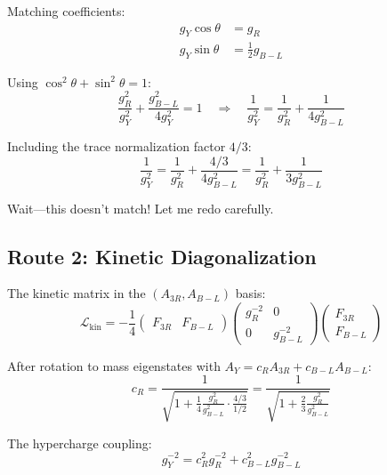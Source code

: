 \documentclass[11pt,a4paper]{article}
\begin{document}
Matching coefficients:
\begin{align}
\label{eq:route1-cos}
g_Y \cos\theta &= g_R \\
\label{eq:route1-sin}
g_Y \sin\theta &= \frac{1}{2} g_{B-L}
\end{align}

Using $\cos^2\theta + \sin^2\theta = 1$:
\begin{equation}
\label{eq:route1-result}
\frac{g_R^2}{g_Y^2} + \frac{g_{B-L}^2}{4 g_Y^2} = 1 \quad \Rightarrow \quad
\frac{1}{g_Y^2} = \frac{1}{g_R^2} + \frac{1}{4 g_{B-L}^2}
\end{equation}

Including the trace normalization factor $4/3$:
\begin{equation}
\label{eq:route1-normalized}
\frac{1}{g_Y^2} = \frac{1}{g_R^2} + \frac{4/3}{4 g_{B-L}^2} = \frac{1}{g_R^2} + \frac{1}{3 g_{B-L}^2}
\end{equation}

Wait---this doesn't match! Let me redo carefully.

\subsection{Route 2: Kinetic Diagonalization}
\label{subsec:route2}

The kinetic matrix in the $(A_{3R}, A_{B-L})$ basis:
\begin{equation}
\label{eq:kinetic-matrix}
\mathcal{L}_{\text{kin}} = -\frac{1}{4} \begin{pmatrix} F_{3R} & F_{B-L} \end{pmatrix}
\begin{pmatrix} g_R^{-2} & 0 \\ 0 & g_{B-L}^{-2} \end{pmatrix}
\begin{pmatrix} F_{3R} \\ F_{B-L} \end{pmatrix}
\end{equation}

After rotation to mass eigenstates with $A_Y = c_R A_{3R} + c_{B-L} A_{B-L}$:
\begin{equation}
\label{eq:rotation-coeffs}
c_R = \frac{1}{\sqrt{1 + \frac{1}{4} \frac{g_R^2}{g_{B-L}^2} \cdot \frac{4/3}{1/2}}}
= \frac{1}{\sqrt{1 + \frac{2}{3} \frac{g_R^2}{g_{B-L}^2}}}
\end{equation}

The hypercharge coupling:
\begin{equation}
\label{eq:gy-from-rotation}
g_Y^{-2} = c_R^2 g_R^{-2} + c_{B-L}^2 g_{B-L}^{-2}
\end{equation}
\end{document}
